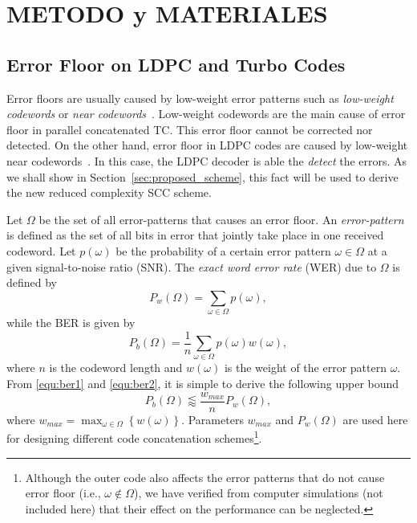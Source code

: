 \documentclass[conference]{IEEEtran}
\begin{document}
\section{METODO y MATERIALES} \label{sec:background}


\subsection{Error Floor on LDPC and Turbo Codes} \label{sec:errorfloor_model}

Error floors are usually caused by low-weight error patterns such as
\emph{low-weight codewords} or \emph{near
  codewords}~\cite{RL2009,R2003}. Low-weight codewords are the main
cause of error floor in parallel concatenated TC. This error floor
cannot be corrected nor detected. On the other hand, error floor in
LDPC codes are caused by low-weight near codewords~\cite{R2003}. In
this case, the LDPC decoder is able the \emph{detect} the errors. As
we shall show in Section~\ref{sec:proposed_scheme}, this fact will be
used to derive the new reduced complexity SCC scheme.

Let $\Omega$ be the set of all error-patterns that causes an error
floor. An \emph{error-pattern} is defined as the set of all bits in
error that jointly take place in one received codeword. Let
$p(\omega)$ be the probability of a certain error pattern $\omega \in
\Omega$ at a given signal-to-noise ratio (SNR). The \textit{exact word
  error rate} (WER) due to $\Omega$ is defined by
\begin{equation}\label{equ:ber1}
  P_w(\Omega) = \sum_{\omega\in\Omega} p(\omega),
\end{equation}
while the BER is given by
\begin{equation}\label{equ:ber2}
  P_b(\Omega) = \frac{1}{n}\sum_{\omega\in\Omega} p(\omega)w(\omega),
\end{equation}
where $n$ is the codeword length and $w(\omega)$ is the weight of the
error pattern $\omega$. From \eqref{equ:ber1} and \eqref{equ:ber2}, it
is simple to derive the following upper bound
\begin{equation}\label{equ:ber3}
  P_b(\Omega) \lessapprox\frac{w_{max}}{n} P_w(\Omega),
\end{equation}
where $w_{max}= \max_{\omega \in \Omega} \left
\{w(\omega)\right\}$. Parameters $w_{max}$ and $P_w(\Omega)$ are used
here for designing different code concatenation
schemes\footnote{Although the outer code also affects the error
  patterns that do not cause error floor (i.e., $\omega\notin\Omega$),
  we have verified from computer simulations (not included here) that
  their effect on the performance can be neglected.}.
\end{document}
